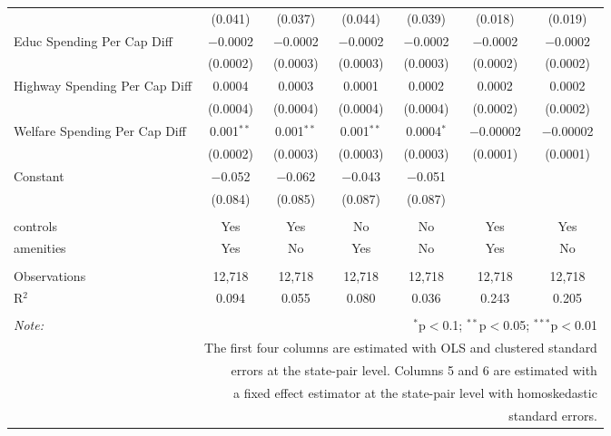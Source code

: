 \begin{table}[!htbp]
\begin{tabular}{@{\extracolsep{5pt}}lcccccc}
  & (0.041) & (0.037) & (0.044) & (0.039) & (0.018) & (0.019) \\ 
  Educ Spending Per Cap Diff & $-$0.0002 & $-$0.0002 & $-$0.0002 & $-$0.0002 & $-$0.0002 & $-$0.0002 \\ 
  & (0.0002) & (0.0003) & (0.0003) & (0.0003) & (0.0002) & (0.0002) \\ 
  Highway Spending Per Cap Diff & 0.0004 & 0.0003 & 0.0001 & 0.0002 & 0.0002 & 0.0002 \\ 
  & (0.0004) & (0.0004) & (0.0004) & (0.0004) & (0.0002) & (0.0002) \\ 
  Welfare Spending Per Cap Diff & 0.001$^{**}$ & 0.001$^{**}$ & 0.001$^{**}$ & 0.0004$^{*}$ & $-$0.00002 & $-$0.00002 \\ 
  & (0.0002) & (0.0003) & (0.0003) & (0.0003) & (0.0001) & (0.0001) \\ 
  Constant & $-$0.052 & $-$0.062 & $-$0.043 & $-$0.051 &  &  \\ 
  & (0.084) & (0.085) & (0.087) & (0.087) &  &  \\ 
 \hline \\[-1.8ex] 
controls & Yes & Yes & No & No & Yes & Yes \\ 
amenities & Yes & No & Yes & No & Yes & No \\ 
\hline \\[-1.8ex] 
Observations & 12,718 & 12,718 & 12,718 & 12,718 & 12,718 & 12,718 \\ 
R$^{2}$ & 0.094 & 0.055 & 0.080 & 0.036 & 0.243 & 0.205 \\ 
\hline 
\hline \\[-1.8ex] 
\textit{Note:}  & \multicolumn{6}{r}{$^{*}$p$<$0.1; $^{**}$p$<$0.05; $^{***}$p$<$0.01} \\ 
 & \multicolumn{6}{r}{The first four columns are estimated with OLS and clustered standard} \\ 
 & \multicolumn{6}{r}{ errors at the state-pair level. Columns 5 and 6 are estimated with} \\ 
 & \multicolumn{6}{r}{a fixed effect estimator at the state-pair level with homoskedastic} \\ 
 & \multicolumn{6}{r}{standard errors.} \\ 
\end{tabular} 
\end{table} 
